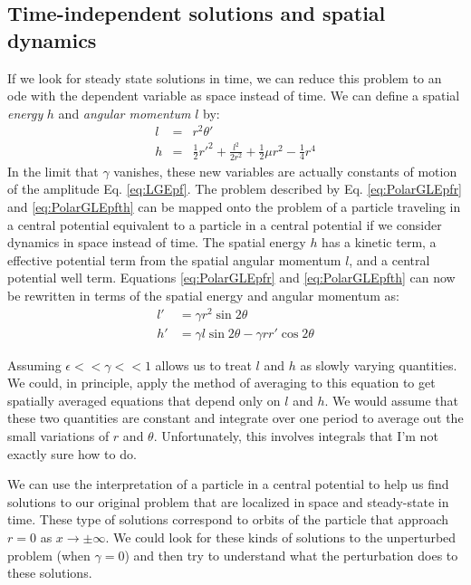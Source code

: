 \documentclass[api,pof,pre,12pt,a4paper]{revtex4-1}
\begin{document}
\subsection{Time-independent solutions and spatial dynamics}
If we look for steady state solutions in time, we can reduce this problem to an ode with the dependent variable as space instead of time.  We can define a spatial {\it energy} $h$ and {\it angular momentum} $l$ by:
\begin{eqnarray}
l &=& r^2\theta' \\
h &=& \frac{1}{2} r'^2 +\frac{l^2}{2r^2} +\frac{1}{2}\mu r^2 -\frac{1}{4} r^4
\end{eqnarray}
In the limit that $\gamma$ vanishes, these new variables are actually constants of motion of the amplitude Eq. \ref{eq:LGEpf}.  The problem described by Eq. \eqref{eq:PolarGLEpfr} and \eqref{eq:PolarGLEpfth} can be mapped onto the problem of a particle traveling in a central potential equivalent to a particle in a central potential if we consider dynamics in space instead of time.  The spatial energy $h$ has a kinetic term, a effective potential term from the spatial angular momentum $l$, and a central potential well term.  Equations \eqref{eq:PolarGLEpfr} and \eqref{eq:PolarGLEpfth} can now be rewritten in terms of the spatial energy and angular momentum as:
\begin{subequations}
\begin{align}
l' &= \gamma r^2 \sin 2\theta 
\label{eq:CentPotL} \\
h'&= \gamma l \sin 2\theta-\gamma r r' \cos 2\theta
\label{eq:CentPotH}
\end{align}
\end{subequations}

Assuming $\epsilon <<\gamma <<1$ allows us to treat $l$ and $h$ as slowly varying quantities.  We could, in principle, apply the method of averaging to this equation to get spatially averaged equations that depend only on $l$ and $h$.  We would assume that these two quantities are constant and integrate over one period to average out the small variations of $r$ and $\theta$.  Unfortunately, this involves integrals that I'm not exactly sure how to do.

We can use the interpretation of a particle in a central potential to help us find solutions to our original problem that are localized in space and steady-state in time.  These type of solutions correspond to  orbits of the particle that approach $r=0$ as $x\rightarrow \pm \infty$.  We could look for these kinds of solutions to the unperturbed problem (when $\gamma=0$) and then try to understand what the perturbation does to these solutions. 
\end{document}
